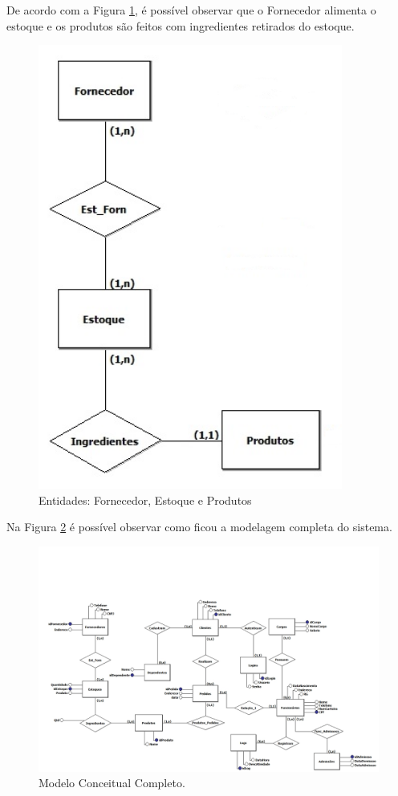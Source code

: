 \documentclass[
	12pt,				%
	openright,			%
	oneside,			%
	a4paper,			%
	chapter=TITLE,		%
	section=TITLE,		%
	english,			%
	brazil				%
	]{abntex2}
\begin{document}
    De acordo com a Figura \ref{mc_03}, é possível observar que o 
    Fornecedor alimenta o estoque e os produtos são feitos com ingredientes 
    retirados do estoque.
    \begin{figure}[h]
         \centering
         \includegraphics[width=10cm,keepaspectratio]{Imgs/MC_03}
         \caption{Entidades: Fornecedor, Estoque e Produtos}
         \label{mc_03}
    \end{figure}

    \newpage
    
    Na Figura \ref{mc_00} é possível observar como ficou a modelagem completa 
    do sistema.
    \begin{figure}[h]
         \centering
         \includegraphics[width=20cm,keepaspectratio,angle=90]{Imgs/MC_00}
         \caption{Modelo Conceitual Completo.}
         \label{mc_00}
    \end{figure}    
\end{document}
